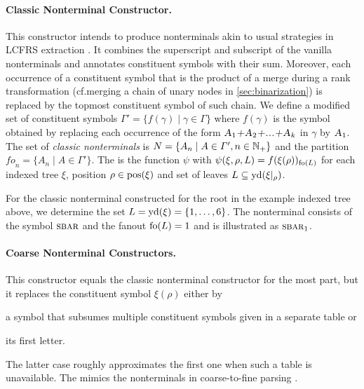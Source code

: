 \documentclass[../../document.tex]{subfiles}
\begin{document}
    \paragraph{Classic Nonterminal Constructor.}
    This constructor intends to produce nonterminals akin to usual strategies in LCFRS extraction \citep{MaierSogaard08}.
    It combines the superscript and subscript of the vanilla nonterminals and annotates constituent symbols with their sum.
    Moreover, each occurrence of a constituent symbol that is the product of a merge during a rank transformation (cf.\@ merging a chain of unary nodes in \cref{sec:binarization}) is replaced by the topmost constituent symbol of such chain.
    We define a modified set of constituent symbols \(\varGamma' = \{ f(\gamma) \mid \gamma \in \varGamma \}\) where \(f(\gamma)\) is the symbol obtained by replacing each occurrence of the form \(\textsc{\textsl{A$_1$+A$_2$+...+A$_k$}}\) in \(\gamma\) by \(\textsc{\textsl{A$_1$}}\).
    The set of \emph{classic nonterminals} is \(N = \{ A_n \mid A \in \varGamma', n \in \mathbb{N}_+ \}\) and the partition \(\mathit{fo}_n = \{A_n \mid A \in \varGamma'\}\).
    The  is the function \(\psi\) with \(\psi(\xi, \rho, L) = f(\xi(\rho))_{\operatorname{fo}(L)}\) for each indexed tree \(\xi\), position \(\rho \in \operatorname{pos}(\xi)\) and set of leaves \(L \subseteq \operatorname{yd}(\xi|_\rho)\).

    \begin{example}
    For the classic nonterminal constructed for the root in the example indexed tree above, we determine the set \(L = \operatorname{yd}(\xi) = \{1,\ldots,6\}\).
    The nonterminal consists of the symbol \(\textsc{sbar}\) and the fanout \(\operatorname{fo}(L) = 1\) and is illustrated as \(\textsc{sbar}_1\).
    \end{example}

    \paragraph{Coarse Nonterminal Constructors.}
    This constructor equals the classic nonterminal constructor for the most part, but it replaces the constituent symbol \(\xi(\rho)\) either by
    \begin{inparaenum}
        \item a symbol that subsumes multiple constituent symbols given in a separate table or
        \item its first letter.
    \end{inparaenum}
    The latter case roughly approximates the first one when such a table is unavailable.
    The  mimics the nonterminals in coarse-to-fine parsing \citep{Cha06,Tei17}.
\end{document}
